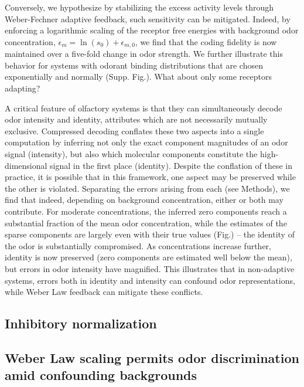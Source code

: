 Conversely, we hypothesize by stabilizing the excess activity levels through Weber-Fechner adaptive feedback, such sensitivity can be mitigated. Indeed, by enforcing a logarithmic scaling of the receptor free energies with background odor concentration, $\epsilon_m = \ln(s_0) + \epsilon_{m, 0}$, we find that the coding fidelity is now maintained over a five-fold change in odor strength. We further illustrate this behavior for systems with odorant binding distributions that are chosen exponentially and normally (Supp. Fig.). {\color{blue} What about only some receptors adapting?}



A critical feature of olfactory systems is that they can simultaneously decode odor intensity and identity, attributes which are not necessarily mutually exclusive. Compressed decoding conflates these two aspects into a single computation by inferring not only the exact component magnitudes of an odor signal (intensity), but also which molecular components constitute the high-dimensional signal in the first place (identity). Despite the conflation of these in practice, it is possible that in this framework, one aspect may be preserved while the other is violated. Separating the errors arising from each (see Methods), we find that indeed, depending on background concentration, either or both may contribute. For moderate concentrations, the inferred zero components reach a substantial fraction of the mean odor concentration, while the estimates of the sparse components are largely even with their true values (Fig.) -- the identity of the odor is substantially compromised. As concentrations increase further, identity is now preserved (zero components are estimated well below the mean), but errors in odor intensity have magnified. This illustrates that in non-adaptive systems, errors both in identity and intensity can confound odor representations, while Weber Law feedback can mitigate these conflicts. 

\subsection{Inhibitory normalization}

\subsection{Weber Law scaling permits odor discrimination amid confounding backgrounds}

